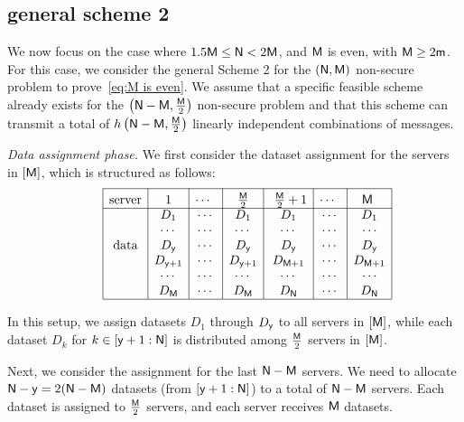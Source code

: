 \documentclass[conference,letterpaper]{IEEEtran}
\begin{document}
\subsection{general scheme 2}
\label{general scheme 2}
We now focus on the case where $1.5 {\sf M} \leq {\sf N} < 2 {\sf M}$, and ${\sf M}$ is even, with ${\sf M} \geq 2{\sf m}$. For this case, we consider the general Scheme 2 for the $({\sf N}, {\sf M})$ non-secure problem to prove~\eqref{eq:M is even}. We assume that a specific feasible scheme already exists for the $\left({\sf N} - {\sf M}, \frac{{\sf M}}{2}\right)$ non-secure problem and that this scheme can transmit a total of $h\left({\sf N} - {\sf M}, \frac{{\sf M}}{2}\right)$ linearly independent combinations of messages.

{\it Data assignment phase.}
We first consider the dataset assignment for the servers in $[{\sf M}]$, which is structured as follows:
\begin{align*}
\begin{array}{rl|c|c|c|c|c|c|c|}\cline{3-3}\cline{4-4}\cline{5-5}\cline{6-6}\cline{7-7}\cline{8-8}\cline{9-9}
&&\rule{0pt}{1.2em}\mbox{server} & \rule{0pt}{1.2em}\mbox{1} &\rule{0pt}{1.2em}\mbox{$\cdots$ } &  \rule{0pt}{1.2em}\mbox{ $\frac{\Msf}{2}$ } & \rule{0pt}{1.2em}\mbox{ $\frac{\Msf}{2}  +1$}&  \rule{0pt}{1.2em}\mbox{$\cdots$ } &  \rule{0pt}{1.2em}\mbox{$\Msf$ }\\ 
\cline{3-3}\cline{4-4}\cline{5-5}\cline{6-6}\cline{7-7}\cline{8-8}\cline{9-9}
&& &D_1 & \cdots & D_1 & D_1 & \cdots & D_1 \\
&& &\cdots & \cdots & \cdots & \cdots & \cdots & \cdots \\ 
&& \mbox{data}&D_{\ysf} & \cdots & D_{\ysf} & D_{\ysf} & \cdots & D_{\ysf} \\
&& &D_{\ysf+1} & \cdots & D_{\ysf+1} & D_{\Msf+1} & \cdots & D_{\Msf+1} \\ 
&& &\cdots & \cdots & \cdots & \cdots & \cdots & \cdots \\
&& &D_{\Msf} & \cdots & D_{\Msf}&  D_{\Nsf} & \cdots & D_{\Nsf}\\  
\cline{3-3}\cline{4-4}\cline{5-5}\cline{6-6}\cline{7-7}\cline{8-8}\cline{9-9}
\end{array}
\end{align*}

In this setup, we assign datasets $D_1$ through $D_{{\sf y}}$ to all servers in $[{\sf M}]$, while each dataset $D_k$ for $k \in [{\sf y}+1 : {\sf N}]$ is distributed among $\frac{{\sf M}}{2}$ servers in $[{\sf M}]$.

Next, we consider the assignment for the last ${\sf N}-{\sf M}$ servers.
We need to allocate ${\sf N}-{\sf y} = 2({\sf N}-{\sf M})$ datasets (from $[{\sf y}+1 : {\sf N}]$) to a total of ${\sf N}-{\sf M}$ servers. Each dataset is assigned to $\frac{{\sf M}}{2}$ servers, and each server receives ${\sf M}$ datasets. 
\end{document}
